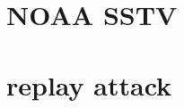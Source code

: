 \documentclass[conference]{IEEEtran}
\begin{document}
\section{NOAA SSTV} %

\section{replay attack} %


%
%
\end{document}
